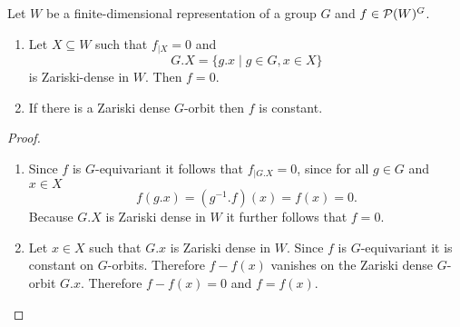 \begin{lem}\label{lem: zariski density orbits}
  Let $W$ be a finite-dimensional representation of a group $G$ and $f \in \mathcal{P}(W)^G$.
  \begin{enumerate}[label=\emph{\alph*)},leftmargin=*]
    \item
      Let $X \subseteq W$ such that $f_{|X} = 0$ and
      \[
        G.X = \{g.x \mid g \in G, x \in X\}
      \]
      is Zariski-dense in $W$. Then $f = 0$.
    \item
      If there is a Zariski dense $G$-orbit then $f$ is constant.
  \end{enumerate}
\end{lem}
\begin{proof}
  \begin{enumerate}[label=\emph{\alph*)},leftmargin=*]
    \item
      Since $f$ is $G$-equivariant it follows that $f_{|G.X} = 0$, since for all $g \in G$ and $x \in X$
      \[
        f(g.x) = \left(g^{-1}.f\right)(x) = f(x) = 0.
      \]
      Because $G.X$ is Zariski dense in $W$ it further follows that $f = 0$.
    \item
      Let $x \in X$ such that $G.x$ is Zariski dense in $W$. Since $f$ is $G$-equivariant it is constant on $G$-orbits. Therefore $f-f(x)$ vanishes on the Zariski dense $G$-orbit $G.x$. Therefore $f-f(x) = 0$ and $f = f(x)$.
    \qedhere
  \end{enumerate}
\end{proof}


